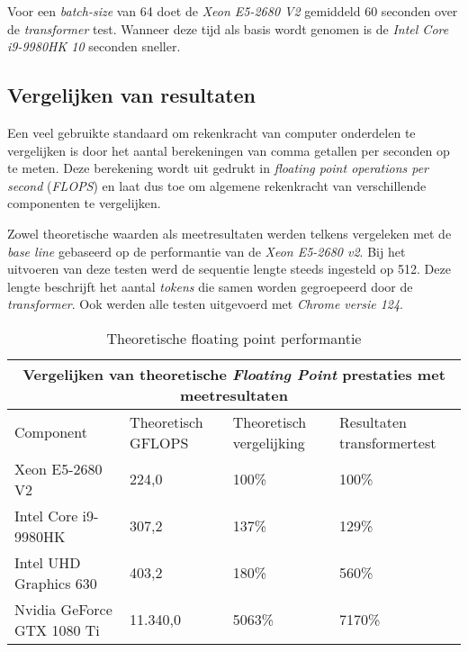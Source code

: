\bigbreak{}

Voor een \textit{batch-size} van 64 doet de \textit{Xeon E5-2680 V2} gemiddeld 60 seconden over de \textit{transformer} test. Wanneer deze tijd als basis wordt genomen is de \textit{Intel Core i9-9980HK 10} seconden sneller.

\subsection{Vergelijken van resultaten}

Een veel gebruikte standaard om rekenkracht van computer onderdelen te vergelijken is door het aantal berekeningen van comma getallen per seconden op te meten. Deze berekening wordt uit gedrukt in \emph{floating point operations per second} (\textit{FLOPS}) en laat dus toe om algemene rekenkracht van verschillende componenten te vergelijken. 

\bigbreak{}

Zowel theoretische waarden als meetresultaten werden telkens vergeleken met de \textit{base line} gebaseerd op de performantie van de \textit{Xeon E5-2680 v2}. Bij het uitvoeren van deze testen werd de sequentie lengte steeds ingesteld op 512. Deze lengte beschrijft het aantal \textit{tokens} die samen worden gegroepeerd door de \textit{transformer}. Ook werden alle testen uitgevoerd met \emph{Chrome versie 124}.

\break{}

\begin{table}[t]
    \begin{tabular}{ |p{5.5cm}|p{2.5cm}|p{2.5cm}|p{3.5cm}|  }
        \hline
        \multicolumn{4}{|c|}{Vergelijken van theoretische \textit{Floating Point} prestaties met meetresultaten} \\
        \hline
        Component& Theoretisch GFLOPS & Theoretisch vergelijking & Resultaten transformertest\\
        \hline
            Xeon E5-2680 V2             & 224,0     & 100\%  & 100\%       \\
            Intel Core i9-9980HK        & 307,2     & 137\%  & 129\%    \\
            Intel UHD Graphics 630      & 403,2     & 180\%  & 560\%    \\
            Nvidia GeForce GTX 1080 Ti  & 11.340,0  & 5063\% & 7170\%   \\
        \hline
    \end{tabular}
    \caption[\textit{Floating point} performantie \textit{CPU's} en \textit{GPU's} \autocite{Intel2024, Intel2024a, TechPowerUp2017, TechPowerUp2017a}]{Theoretische floating point performantie \autocite{Intel2024, Intel2024a, TechPowerUp2017, TechPowerUp2017a}}
    \label{tab:TheoreticalVersusMeasuredPerf}
\end{table}

